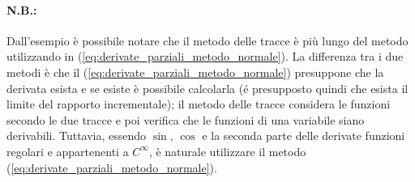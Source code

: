 \paragraph{N.B.:} Dall'esempio è possibile notare che il metodo delle tracce è più lungo del metodo utilizzando in (\ref{eq:derivate_parziali_metodo_normale}). La differenza tra i due metodi è che il (\ref{eq:derivate_parziali_metodo_normale}) presuppone che la derivata esista e se esiste è possibile calcolarla (é presupposto quindi che esista il limite del rapporto incrementale); il metodo delle tracce considera le funzioni secondo le due tracce e poi verifica che le funzioni di una variabile siano derivabili. Tuttavia, essendo $\sin,\, \cos$ e la seconda parte delle derivate funzioni regolari e appartenenti a $C^\infty$,  è naturale utilizzare il metodo (\ref{eq:derivate_parziali_metodo_normale}).

